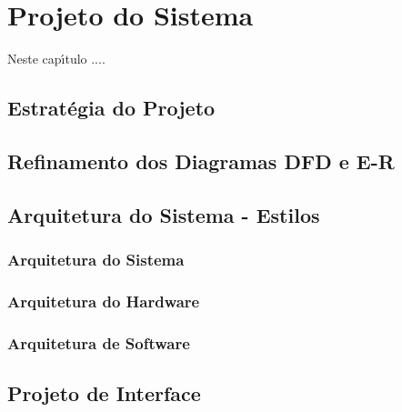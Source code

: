 
\chapter{Projeto do Sistema}

Neste cap\'{\i}tulo ....


\section{Estrat\'{e}gia do Projeto}


\section{Refinamento dos Diagramas DFD e E-R}


\section{Arquitetura do Sistema - Estilos}



    \subsection{Arquitetura do Sistema}



    \subsection{Arquitetura do Hardware}


    \subsection{Arquitetura de Software}


\section{Projeto de Interface}


